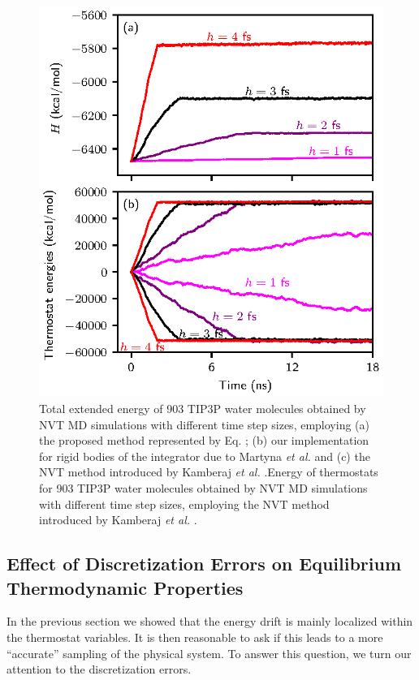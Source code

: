 \documentclass[
journal=jctcce,
layout=twocolumn
]{achemso}
\begin{document}
\begin{figure}
	\includegraphics{Figures/numerical_stability.eps}
    \caption{Total extended energy of 903 TIP3P\cite{Jorgensen_1983} water molecules obtained by NVT MD simulations with different time
step sizes, employing (a) the proposed method represented by Eq. ; (b) our implementation for rigid bodies of the integrator due to Martyna \textit{et al.} \cite{Martyna_1996} and (c) the NVT method introduced by Kamberaj \textit{et al.} \cite{Kamberaj_2005}.Energy of thermostats for 903 TIP3P\cite{Jorgensen_1983} water molecules obtained by NVT MD simulations with different time
step sizes, employing the NVT method introduced by Kamberaj \textit{et al.} \cite{Kamberaj_2005}.}
	\label{fig:num_stab}
\end{figure}

\subsection*{Effect of Discretization Errors on Equilibrium Thermodynamic Properties}

In the previous section we showed that the energy drift is mainly localized within the thermostat variables.
It is then reasonable to ask if this leads to a more ``accurate'' sampling of the physical system.
To answer this question, we turn our attention to the discretization errors.
\end{document}
